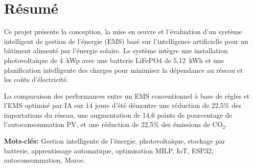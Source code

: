 \chapter*{Résumé}

Ce projet présente la conception, la mise en \oe uvre et l'évaluation d'un système intelligent de gestion de l'énergie (EMS) basé sur l'intelligence artificielle pour un bâtiment alimenté par l'énergie solaire. Le système intègre une installation photovoltaïque de 4~kWp avec une batterie LiFePO4 de 5,12~kWh et une planification intelligente des charges pour minimiser la dépendance au réseau et les coûts d'électricité.

La comparaison des performances entre un EMS conventionnel à base de règles et l'EMS optimisé par IA sur 14 jours d'été démontre une réduction de 22,5\% des importations du réseau, une augmentation de 14,6 points de pourcentage de l'autoconsommation PV, et une réduction de 22,5\% des émissions de CO$_2$.

\vspace{0.5cm}
\noindent\textbf{Mots-clés:} Gestion intelligente de l'énergie, photovoltaïque, stockage par batterie, apprentissage automatique, optimisation MILP, IoT, ESP32, autoconsommation, Maroc.
